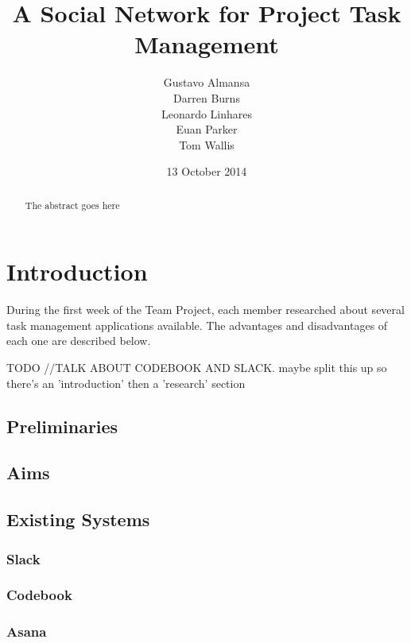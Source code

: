 \documentclass[a4paper]{l3proj}
\begin{document}
\title{A Social Network for Project Task Management}
\author{Gustavo Almansa\\
        Darren Burns \\
        Leonardo Linhares \\
        Euan Parker \\
		Tom Wallis \\
}
\date{13 October 2014}
\maketitle
\begin{abstract}

The abstract goes here

\end{abstract}
\educationalconsent
\tableofcontents
\chapter{Introduction}
\label{intro}

During the first week of the Team Project, each member researched about several
task management applications available. The advantages and disadvantages of each
one are described below.

TODO
//TALK ABOUT CODEBOOK AND SLACK.  maybe split this up so there's an 'introduction' then a 'research' section

\section{Preliminaries}
\section{Aims}
\section{Existing Systems}

\subsection{Slack}
\label{slack}

\subsection{Codebook}
\label{codebook}

\subsection{Asana}
\label{asana}
\end{document}
